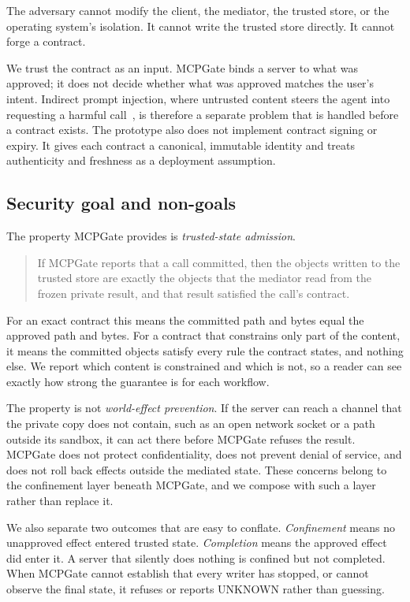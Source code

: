 The adversary cannot modify the client, the mediator, the trusted store, or the
operating system's isolation. It cannot write the trusted store directly. It
cannot forge a contract.

We trust the contract as an input. MCPGate binds a server to what was
approved; it does not decide whether what was approved matches the user's
intent. Indirect prompt injection, where untrusted content steers the agent
into requesting a harmful call~\cite{greshake2023injection,zhan2024injecagent},
is therefore a separate problem that is handled before a contract exists. The
prototype also does not implement contract signing or expiry. It gives each
contract a canonical, immutable identity and treats authenticity and freshness
as a deployment assumption.

\subsection{Security goal and non-goals}

The property MCPGate provides is \emph{trusted-state admission}.

\begin{quote}
If MCPGate reports that a call committed, then the objects written to the
trusted store are exactly the objects that the mediator read from the frozen
private result, and that result satisfied the call's contract.
\end{quote}

For an exact contract this means the committed path and bytes equal the
approved path and bytes. For a contract that constrains only part of the
content, it means the committed objects satisfy every rule the contract states,
and nothing else. We report which content is constrained and which is not, so
a reader can see exactly how strong the guarantee is for each workflow.

The property is not \emph{world-effect prevention}. If the server can reach a
channel that the private copy does not contain, such as an open network socket
or a path outside its sandbox, it can act there before MCPGate refuses the
result. MCPGate does not protect confidentiality, does not prevent denial of
service, and does not roll back effects outside the mediated state. These
concerns belong to the confinement layer beneath MCPGate, and we compose with
such a layer rather than replace it.

We also separate two outcomes that are easy to conflate. \emph{Confinement}
means no unapproved effect entered trusted state. \emph{Completion} means the
approved effect did enter it. A server that silently does nothing is confined
but not completed. When MCPGate cannot establish that every writer has stopped,
or cannot observe the final state, it refuses or reports UNKNOWN rather than
guessing.
